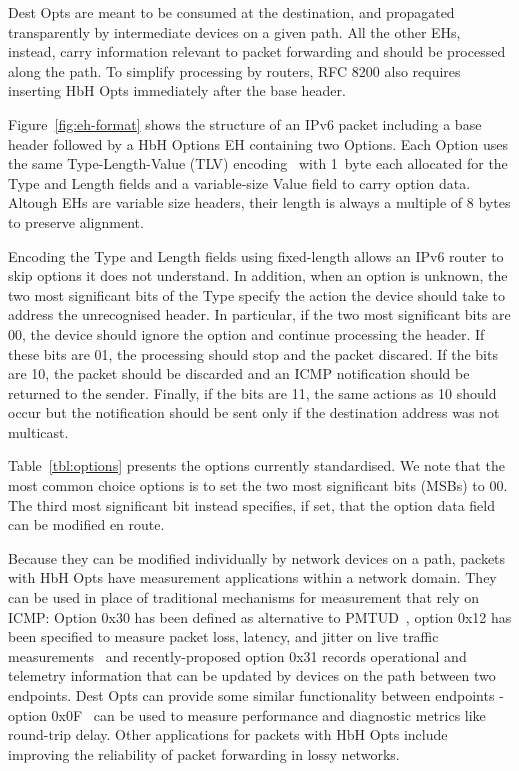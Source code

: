 \documentclass[conference]{IEEEtran}
\begin{document}
Dest Opts are meant to be consumed at the destination, and propagated
transparently by intermediate devices on a given path. All the other EHs, instead, carry
information relevant to packet forwarding and should be processed along the
path. To simplify processing by routers, RFC 8200 also requires inserting HbH
Opts immediately after the base header.

Figure~\ref{fig:eh-format} shows the structure of an IPv6 packet including a base
header followed by a HbH Options EH containing two Options.  Each Option uses the same Type-Length-Value (TLV) encoding~\cite{RFC8200} with 1~byte each allocated for the Type and Length fields and a variable-size Value field to carry option data. Altough EHs are variable size headers, their length is always a multiple of 8 bytes to preserve alignment.

Encoding the Type and Length fields using fixed-length allows an IPv6
router to skip options it does not understand. In
addition, when an option is unknown, the two most significant bits of the Type
specify the action the device should take to address the unrecognised header.
In particular, if the two most significant bits are 00, the device should
ignore the option and continue processing the header. If these bits are 01, the
processing should stop and the packet discared. If the bits are 10,
the packet should be discarded and an ICMP notification should be returned to
the sender. Finally, if the bits are 11, the same actions as 10 should occur
but the notification should be sent only if the destination address was not
multicast. 

Table~\ref{tbl:options} presents the options currently standardised.  We note
that the most common choice options is to set the two most significant bits
(MSBs) to 00.  The third most significant bit instead specifies, if set, 
that the option data field can be modified en route.


Because they can be modified individually by network devices on a path, packets
with HbH Opts have measurement applications within a network domain. They can
be used in place of traditional mechanisms for measurement that rely on ICMP:
Option 0x30 has been defined as alternative to PMTUD~\cite{rfc9268}, option
0x12 has been specified to measure packet loss, latency, and jitter on live
traffic measurements~\cite{rfc9343} and recently-proposed option 0x31 records
operational and telemetry information that can be updated by devices on the
path between two endpoints. Dest Opts can provide some similar functionality
between endpoints - option 0x0F~\cite{rfc8250} can be used to measure
performance and diagnostic metrics like round-trip delay.  Other applications
for packets with HbH Opts include improving the reliability of packet
forwarding in lossy networks.
\end{document}
